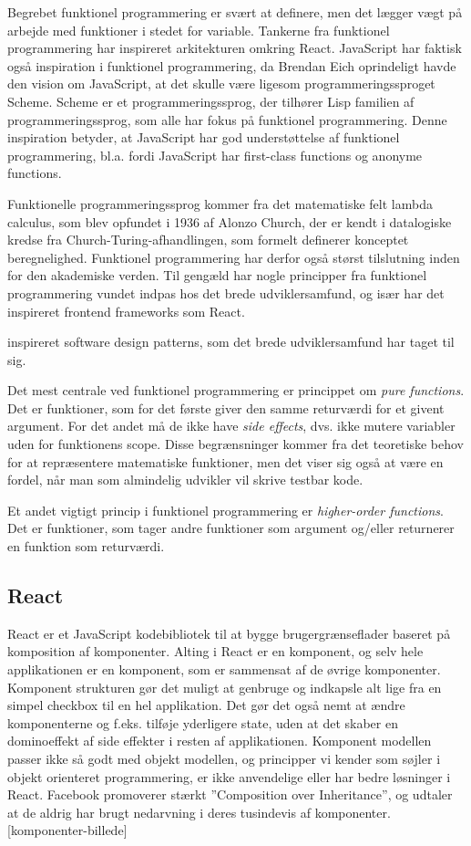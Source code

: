 \documentclass[]{article}
\begin{document}
Begrebet funktionel programmering er svært at definere, men det lægger
vægt på arbejde med funktioner i stedet for variable. Tankerne fra
funktionel programmering har inspireret arkitekturen omkring React.
JavaScript har faktisk også inspiration i funktionel programmering, da
Brendan Eich oprindeligt havde den vision om JavaScript, at det skulle
være ligesom programmeringssproget Scheme. Scheme er et
programmeringssprog, der tilhører Lisp familien af programmeringssprog,
som alle har fokus på funktionel programmering. Denne inspiration
betyder, at JavaScript har god understøttelse af funktionel
programmering, bl.a. fordi JavaScript har first-class functions og
anonyme functions.

Funktionelle programmeringssprog kommer fra det matematiske felt lambda
calculus, som blev opfundet i 1936 af Alonzo Church, der er kendt i
datalogiske kredse fra Church-Turing-afhandlingen, som formelt definerer
konceptet beregnelighed. Funktionel programmering har derfor også størst
tilslutning inden for den akademiske verden. Til gengæld har nogle
principper fra funktionel programmering vundet indpas hos det brede
udviklersamfund, og især har det inspireret frontend frameworks som
React.

inspireret software design patterns, som det brede udviklersamfund har
taget til sig.

Det mest centrale ved funktionel programmering er princippet om
\emph{pure functions}. Det er funktioner, som for det første giver den
samme returværdi for et givent argument. For det andet må de ikke have
\emph{side effects}, dvs. ikke mutere variabler uden for funktionens
scope. Disse begrænsninger kommer fra det teoretiske behov for at
repræsentere matematiske funktioner, men det viser sig også at være en
fordel, når man som almindelig udvikler vil skrive testbar kode.

Et andet vigtigt princip i funktionel programmering er
\emph{higher-order functions}. Det er funktioner, som tager andre
funktioner som argument og/eller returnerer en funktion som returværdi.

\hypertarget{react}{%
\subsection{React}\label{react}}

React er et JavaScript kodebibliotek til at bygge brugergrænseflader
baseret på komposition af komponenter. Alting i React er en komponent,
og selv hele applikationen er en komponent, som er sammensat af de
øvrige komponenter. Komponent strukturen gør det muligt at genbruge og
indkapsle alt lige fra en simpel checkbox til en hel applikation. Det
gør det også nemt at ændre komponenterne og f.eks. tilføje yderligere
state, uden at det skaber en dominoeffekt af side effekter i resten af
applikationen. Komponent modellen passer ikke så godt med objekt
modellen, og principper vi kender som søjler i objekt orienteret
programmering, er ikke anvendelige eller har bedre løsninger i React.
Facebook promoverer stærkt ''Composition over Inheritance'', og udtaler
at de aldrig har brugt nedarvning i deres tusindevis af komponenter.
{[}komponenter-billede{]}
\end{document}

